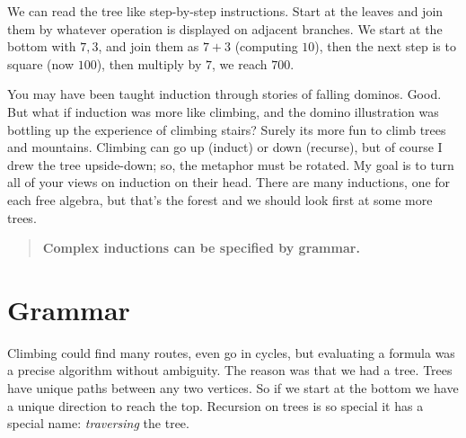 We can read the tree like step-by-step instructions.  Start at the leaves and join
them by whatever operation is displayed on adjacent branches.
We start at the bottom with $7,3$, and join them as $7+3$ (computing $10$),
then the next step is to square (now $100$), then multiply by $7$, we reach $700$.

You may have been taught induction through stories of falling 
dominos.  Good.  But what if induction was more like climbing, 
and the domino illustration was bottling up the experience
of climbing stairs?  Surely its more fun to climb trees and mountains.
Climbing can go up (induct) or down (recurse), but of course I drew the 
tree upside-down; so, the metaphor must be rotated.
My goal is to turn all of your views on induction on their head.
There are many inductions, one for each free algebra, but that's the forest 
and we should look first at some more trees.

\begin{quote}
    \textbf{Complex inductions can be specified by grammar.}
\end{quote}
\section{Grammar}
Climbing could find many routes, even go in cycles, but 
evaluating a formula was a precise algorithm without ambiguity.
The reason was that we had a tree.  Trees have unique paths between 
any two vertices. So if we start at the bottom we have a unique direction to 
reach the top.  Recursion on trees is so special it has a special name:
\emph{traversing} the tree.  

